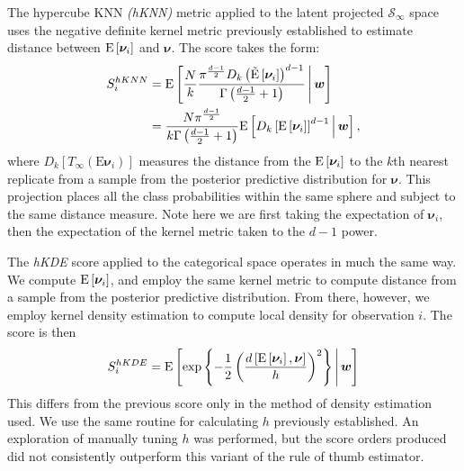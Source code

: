 The hypercube KNN \emph{(hKNN)} metric applied to the latent projected 
    $\mathcal{S}_{\infty}$ space uses the negative definite kernel metric 
    previously established to estimate distance between $\text{E}\left[\bm{\nu}_i\right]$ 
    and $\bm{\nu}$.  The score takes the form:
    \begin{equation}
      \label{score:cat_hknn}
      \begin{aligned}
      S_i^{hKNN} &= \text{E}\left[\frac{N}{k}
        \frac{\pi^{\frac{d-1}{2}}D_{k}
        \left(\tilde{\text{E}}\left[\bm{\nu}_i\right]\right)^{d-1}}{
          \Gamma\left(\frac{d-1}{2} + 1\right)}
      \,\middle\vert\,\bm{w}\right]\\
      &= \frac{N\pi^{\frac{d-1}{2}}}{k\Gamma\left(\frac{d-1}{2} + 1\right)}
      \text{E}\left[D_{k}\left[\text{E}\left[\bm{\nu}_i\right]\right]^{d-1}\,\middle\vert\,\bm{w}\right],
      \end{aligned}
    \end{equation}
    where $D_{k}\left[T_{\infty}(\text{E}\bm{\nu}_i)\right]$ measures the 
    distance from the  $\text{E}\left[\bm{\nu}_i\right]$ to the $k$th nearest replicate from 
    a sample from the posterior predictive distribution for $\bm{\nu}$.  This 
    projection places all the class probabilities within the same sphere and 
    subject to the same distance measure.  Note here we are first taking the 
    expectation of $\bm{\nu}_i$, then the expectation of the kernel metric taken 
    to the $d-1$ power.

The \emph{hKDE} score applied to the categorical space operates in much the 
    same way.  We compute $\text{E}\left[\bm{\nu}_i\right]$, and employ the same kernel 
    metric to compute distance from a sample from the posterior predictive 
    distribution.  From there, however, we employ kernel density estimation 
    to compute local density for observation $i$.  The score is then
    \begin{equation}
        \label{score:cat_hkde}
        S_i^{hKDE} = \text{E}\left[
            \exp\left\lbrace
            -\frac{1}{2}\left(
            \frac{d\left[\text{E}\left[\bm{\nu}_i\right], \bm{\nu}\right]}{h}
            \right)^2
            \right\rbrace 
        \,\middle\vert\, \bm{w}\right]
    \end{equation}
This differs from the previous score only in the method of density estimation 
    used.  We use the same routine for calculating $h$ previously established.  
    An exploration of manually tuning $h$ was performed, but the score orders 
    produced did not consistently outperform this variant of the rule of thumb 
    estimator.

